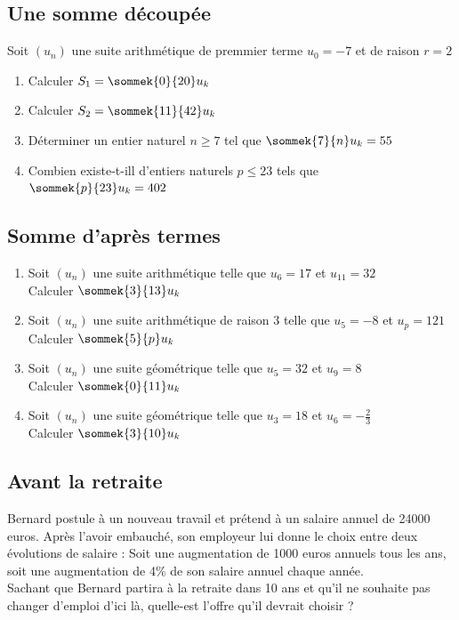 \documentclass[oneside,12pt]{book}          %
\begin{document}
\subsection{Une somme découpée}
Soit $(u_n)$ une suite arithmétique de premmier terme $u_0=-7$ et de raison $r=2$
\begin{enumerate}
    \item Calculer $S_1=\sommek{0}{20}u_k$
    \item Calculer $S_2=\sommek{11}{42}u_k$
    \item Déterminer un entier naturel $n\geq7$ tel que $\sommek{7}{n}u_k=55$
    \item Combien existe-t-ill d'entiers naturels $p\leq23$ tels que $\sommek{p}{23}u_k=402$
\end{enumerate}



\subsection{Somme d'après termes}
\begin{enumerate}
	\item Soit $(u_n)$ une suite arithmétique telle que $u_6=17$ et $u_{11}=32$\\
	Calculer $\sommek{3}{13}u_k$
	\item Soit $(u_n)$ une suite arithmétique de raison 3 telle que $u_5=-8$ et $u_p=121$ \\
	Calculer $\sommek{5}{p}u_k$
	\item Soit $(u_n)$ une suite géométrique telle que $u_5=32$ et $u_9=8$ \\
	Calculer $\sommek{0}{11}u_k$
	\item Soit $(u_n)$ une suite géométrique telle que $u_3=18$ et $u_6=-\frac{2}{3}$ \\
	Calculer $\sommek{3}{10}u_k$
\end{enumerate}



\subsection{Avant la retraite}
Bernard postule à un nouveau travail et prétend à un salaire annuel de 24000 euros. Après l'avoir embauché, son employeur lui donne le choix entre deux évolutions de salaire : Soit une augmentation de 1000 euros annuels tous les ans, soit une augmentation de 4$\%$ de son salaire annuel chaque année. \\
Sachant que Bernard partira à la retraite dans 10 ans et qu'il ne souhaite pas changer d'emploi d'ici là, quelle-est l'offre qu'il devrait choisir ?
\end{document}
